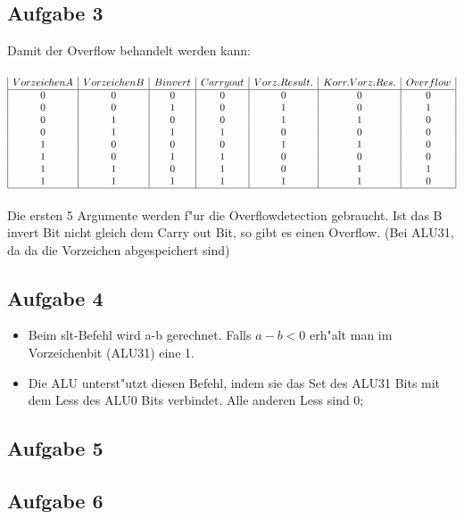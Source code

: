 \documentclass[a4paper,abstracton]{scrartcl}
\begin{document}
\subsection{Aufgabe 3}
Damit der Overflow behandelt werden kann: \\\\
$
\begin{array}{|c|c|c|c|c|c|c|}
Vorzeichen A & Vorzeichen B & B invert & Carry out & Vorz. Result. & Korr. Vorz. Res. & Overflow\\
\hline
0&0&0&0&0&0&0\\
0&0&1&0&1&0&1\\
0&1&0&0&1&1&0\\
0&1&1&1&0&0&0\\
1&0&0&0&1&1&0\\
1&0&1&1&0&0&0\\
1&1&0&1&0&1&1\\
1&1&1&1&1&1&0\\
\hline\end{array}
$ \\\\
Die ersten 5 Argumente werden f"ur die Overflowdetection gebraucht. 
Ist das B invert Bit nicht gleich dem Carry out Bit, so gibt es einen Overflow. (Bei ALU31, da da die Vorzeichen abgespeichert sind)

\subsection{Aufgabe 4}
\begin{itemize}
	\item Beim slt-Befehl wird a-b gerechnet. Falls $ a-b < 0 $ erh"alt man im Vorzeichenbit (ALU31) eine 1.
	\item Die ALU unterst"utzt diesen Befehl, indem sie das Set des ALU31 Bits mit dem Less des ALU0 Bits verbindet. 
	Alle anderen Less sind 0;
\end{itemize}

\subsection{Aufgabe 5}

\subsection{Aufgabe 6}
\end{document}
